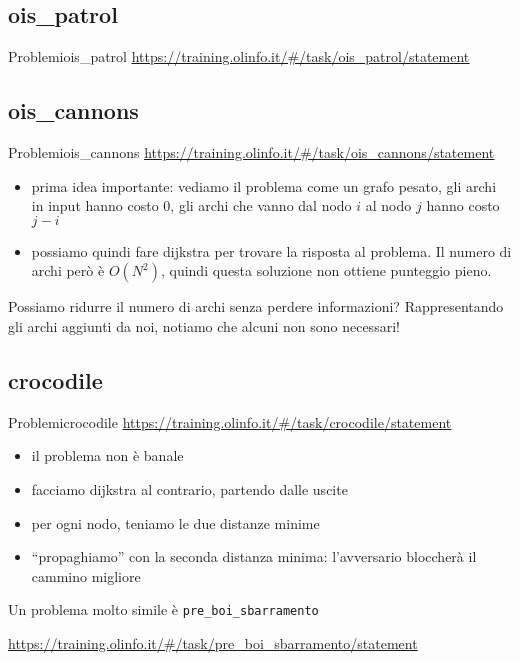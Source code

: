 \documentclass[compress]{beamer}
\begin{document}
\subsection{ois\_patrol}
\begin{frame}{Problemi}{ois\_patrol}
    \underline{\url{https://training.olinfo.it/\#/task/ois_patrol/statement}}
\end{frame}


\subsection{ois\_cannons}
\begin{frame}{Problemi}{ois\_cannons}
    \underline{\url{https://training.olinfo.it/\#/task/ois_cannons/statement}}
    \begin{itemize}
        \item prima idea importante: vediamo il problema come un grafo pesato, gli archi in input hanno costo 0, 
        gli archi che vanno dal nodo $i$ al nodo $j$ hanno costo $j-i$
        \pause
        \item possiamo quindi fare dijkstra per trovare la risposta al problema. Il numero di archi però è $O(N^2)$, 
        quindi questa soluzione non ottiene punteggio pieno.
    \end{itemize}
    \pause
    Possiamo ridurre il numero di archi senza perdere informazioni?
    \pause
    Rappresentando gli archi aggiunti da noi, notiamo che alcuni non sono necessari!
\end{frame}

\subsection{crocodile}
\begin{frame}{Problemi}{crocodile}
    \underline{\url{https://training.olinfo.it/\#/task/crocodile/statement}}
    \pause
    \begin{itemize}
        \item il problema non \`e banale
        \item facciamo dijkstra al contrario, partendo dalle uscite
        \pause
        \item per ogni nodo, teniamo le due distanze minime
        \item ``propaghiamo'' con la seconda distanza minima: l'avversario bloccher\`a il cammino migliore
    \end{itemize}

    \pause
    Un problema molto simile \`e \texttt{pre\_boi\_sbarramento}

    \small{\underline{\url{https://training.olinfo.it/\#/task/pre_boi_sbarramento/statement}}}
\end{frame}
\end{document}
